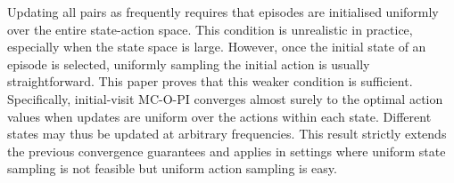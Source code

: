 

Updating all pairs as frequently requires that episodes are initialised uniformly over the entire state-action space.
This condition is unrealistic in practice, especially when the state space is large.
However, once the initial state of an episode is selected, uniformly sampling the initial action is usually straightforward.
This paper proves that this weaker condition is sufficient.
Specifically, initial-visit MC-O-PI converges almost surely to the optimal action values when updates are uniform over the actions within each state.
Different states may thus be updated at arbitrary frequencies.
This result strictly extends the previous convergence guarantees 
and applies in settings where uniform state sampling is not feasible but uniform action sampling is easy.


